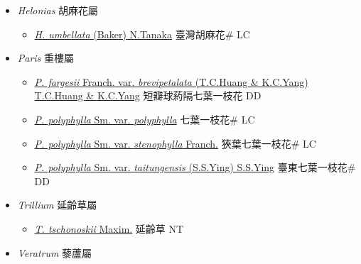 
  \begin{itemize}
 \item[] \textit{Helonias} 胡麻花屬
                    
  \begin{itemize}
        \item[] \href{http://www.theplantlist.org/tpl1.1/search?q=Helonias+umbellata}{\textit{H. umbellata} (Baker) N.Tanaka}   臺灣胡麻花\# LC
  \end{itemize}
 \item[] \textit{Paris} 重樓屬
                    
  \begin{itemize}
        \item[] \href{http://www.theplantlist.org/tpl1.1/search?q=Paris+fargesii+var.+brevipetalata}{\textit{P. fargesii} Franch. var. \textit{brevipetalata} (T.C.Huang \& K.C.Yang) T.C.Huang \& K.C.Yang}   短瓣球葯隔七葉一枝花 DD
        \item[] \href{http://www.theplantlist.org/tpl1.1/search?q=Paris+polyphylla+var.+polyphylla}{\textit{P. polyphylla} Sm. var. \textit{polyphylla}}   七葉一枝花\# LC
        \item[] \href{http://www.theplantlist.org/tpl1.1/search?q=Paris+polyphylla+var.+stenophylla}{\textit{P. polyphylla} Sm. var. \textit{stenophylla} Franch.}   狹葉七葉一枝花\# LC
        \item[] \href{http://www.theplantlist.org/tpl1.1/search?q=Paris+polyphylla+var.+taitungensis}{\textit{P. polyphylla} Sm. var. \textit{taitungensis} (S.S.Ying) S.S.Ying}   臺東七葉一枝花\# DD
  \end{itemize}
 \item[] \textit{Trillium} 延齡草屬
                    
  \begin{itemize}
        \item[] \href{http://www.theplantlist.org/tpl1.1/search?q=Trillium+tschonoskii}{\textit{T. tschonoskii} Maxim.}   延齡草 NT
  \end{itemize}
 \item[] \textit{Veratrum} 藜蘆屬
                    

\end{itemize}
